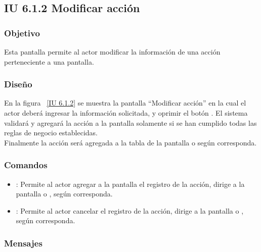 \subsection{IU 6.1.2 Modificar acción}

\subsubsection{Objetivo}
	
	Esta pantalla permite al actor modificar la información de una acción perteneciente a una pantalla.

\subsubsection{Diseño}

    En la figura ~\ref{IU 6.1.2} se muestra la pantalla ``Modificar acción'' en la cual el actor deberá ingresar la información solicitada, y oprimir el botón . El sistema validará y agregará la acción a la pantalla solamente si se han cumplido todas las reglas de negocio establecidas.  \\
    
    Finalmente la acción será agregada a la tabla de la pantalla  o  según corresponda. \\


\subsubsection{Comandos}
\begin{itemize}
	\item {}: Permite al actor agregar a la pantalla el registro de la acción, dirige a la pantalla  o , según corresponda.
	\item {}: Permite al actor cancelar el registro de la acción, dirige a la pantalla  o , según corresponda.
\end{itemize}

\subsubsection{Mensajes}


